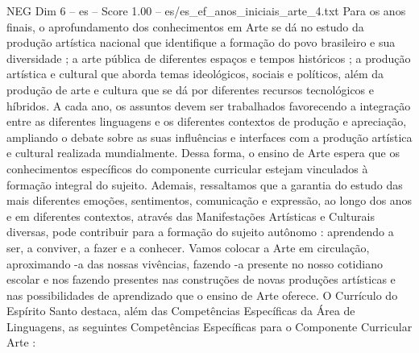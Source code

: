 \begin{textsample}{NEG Dim 6 – es – Score 1.00 – es/es\_ef\_anos\_iniciais\_arte\_4.txt}
Para os anos finais, o aprofundamento dos conhecimentos em Arte se dá no estudo da produção artística nacional que identifique a formação do povo brasileiro e sua diversidade ; a arte pública de diferentes espaços e tempos históricos ; a produção artística e cultural que aborda temas ideológicos, sociais e políticos, além da produção de arte e cultura que se dá por diferentes recursos tecnológicos e híbridos.
A cada ano, os assuntos devem ser trabalhados favorecendo a integração entre as diferentes linguagens e os diferentes contextos de produção e apreciação, ampliando o debate sobre as suas influências e interfaces com a produção artística e cultural realizada mundialmente.
Dessa forma, o ensino de Arte espera que os conhecimentos específicos do componente curricular estejam vinculados à formação integral do sujeito.
Ademais, ressaltamos que a garantia do estudo das mais diferentes emoções, sentimentos, comunicação e expressão, ao longo dos anos e em diferentes contextos, através das Manifestações Artísticas e Culturais diversas, pode contribuir para a formação do sujeito autônomo : aprendendo a ser, a conviver, a fazer e a conhecer.
Vamos colocar a Arte em circulação, aproximando -a das nossas vivências, fazendo -a presente no nosso cotidiano escolar e nos fazendo presentes nas construções de novas produções artísticas e nas possibilidades de aprendizado que o ensino de Arte oferece.
O Currículo do Espírito Santo destaca, além das Competências Específicas da Área de Linguagens, as seguintes Competências Específicas para o Componente Curricular Arte :

\end{textsample}
